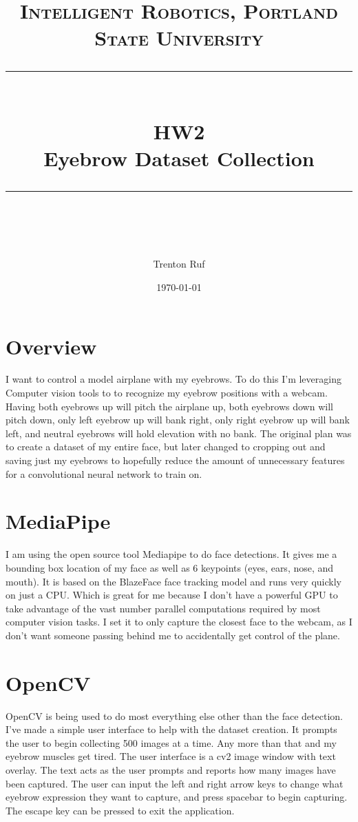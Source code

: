 \documentclass[11pt]{scrartcl} %
\title{	
	\normalfont\normalsize
	\textsc{Intelligent Robotics, Portland State University}\\ %
	\vspace{25pt} %
	\rule{\linewidth}{0.5pt}\\ %
	\vspace{20pt} %
	{\huge HW2}\\ %
	\vspace{4pt} %
	{\large Eyebrow Dataset Collection}\\ %
	\vspace{12pt} %
	\rule{\linewidth}{2pt}\\ %
	\vspace{12pt} %
}
\author{\LARGE Trenton Ruf} %
\date{\normalsize \today} %
\begin{document}
\maketitle %




\renewcommand\thesubsection{\Roman{subsection}}
\section{Overview}
I want to control a model airplane with my eyebrows. To do this I'm leveraging Computer vision tools to to recognize my eyebrow positions with a webcam. Having both eyebrows up will pitch the airplane up, both eyebrows down will pitch down, only left eyebrow up will bank right, only right eyebrow up will bank left, and neutral eyebrows will hold elevation with no bank. The original plan was to create a dataset of my entire face, but later changed to cropping out and saving just my eyebrows to hopefully reduce the amount of unnecessary features for a convolutional neural network to train on.

\section{MediaPipe}
I am using the open source tool Mediapipe to do face detections. It gives me a bounding box location of my face as well as 6 keypoints (eyes, ears, nose, and mouth).  
It is based on the BlazeFace face tracking model and runs very quickly on just a CPU. 
Which is great for me because I don't have a powerful GPU to take advantage of the vast number parallel computations required by most computer vision tasks.
I set it to only capture the closest face to the webcam, as I don't want someone passing behind me to accidentally get control of the plane.

\section{OpenCV}
OpenCV is being used to do most everything else other than the face detection.
I've made a simple user interface to help with the dataset creation. 
It prompts the user to begin collecting 500 images at a time. Any more than that and my eyebrow muscles get tired.
The user interface is a cv2 image window with text overlay. The text acts as the user prompts and reports how many images have been captured.
The user can input the left and right arrow keys to change what eyebrow expression they want to capture, and press spacebar to begin capturing.
The escape key can be pressed to exit the application.
\end{document}
